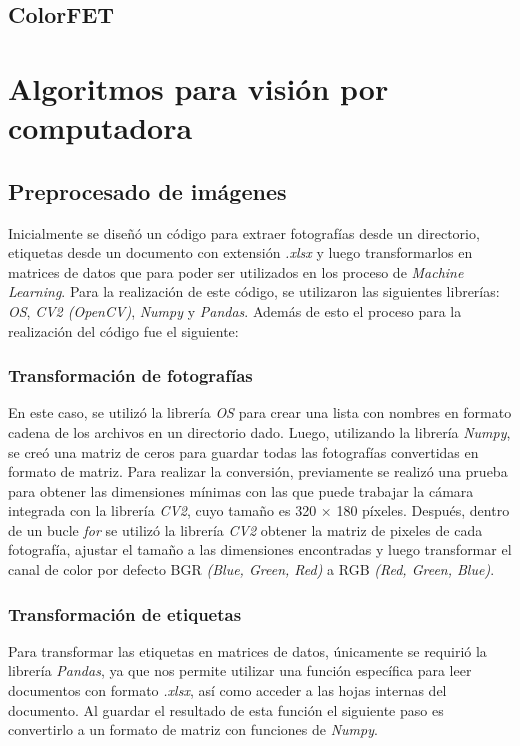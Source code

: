 \section{ColorFET}
\chapter{Algoritmos para visión por computadora}
\section{Preprocesado de imágenes}
Inicialmente se diseñó un código para extraer fotografías desde un directorio, etiquetas desde un documento con extensión \textit{.xlsx} y luego transformarlos en matrices de datos que para poder ser utilizados en los proceso de \textit{Machine Learning}. Para la realización de este código, se utilizaron las siguientes librerías: \textit{OS}, \textit{CV2 (OpenCV)}, \textit{Numpy} y \textit{Pandas}. Además de esto el proceso para la realización del código fue el siguiente: 

\subsection{Transformación de fotografías}
En este caso, se utilizó la librería \textit{OS} para crear una lista con nombres en formato cadena de los archivos en un directorio dado. Luego, utilizando la librería \textit{Numpy}, se creó una matriz de ceros para guardar todas las fotografías convertidas en formato de matriz. Para realizar la conversión, previamente se realizó una prueba para obtener las dimensiones mínimas con las que puede trabajar la cámara integrada con la librería \textit{CV2}, cuyo tamaño es 320 $\times$ 180 píxeles. Después, dentro de un bucle \textit{for} se utilizó la librería \textit{CV2} obtener la matriz de pixeles de cada fotografía, ajustar el tamaño a las dimensiones encontradas y luego transformar el canal de color por defecto BGR \textit{(Blue, Green, Red)} a RGB \textit{(Red, Green, Blue)}. 

\subsection{Transformación de etiquetas}

Para transformar las etiquetas en matrices de datos, únicamente se requirió la librería \textit{Pandas}, ya que nos permite utilizar una función específica para leer documentos con formato \textit{.xlsx}, así como acceder a las hojas internas del documento. Al guardar el resultado de esta función el siguiente paso es convertirlo a un formato de matriz con funciones de \textit{Numpy}. 

